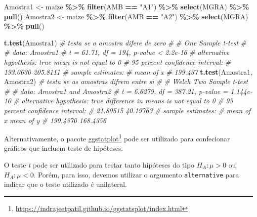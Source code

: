 \documentclass[
]{book}
\newenvironment{Shaded}{\begin{snugshade}}{\end{snugshade}}
\newcommand{\CommentTok}[1]{\textcolor[rgb]{0.56,0.35,0.01}{\textit{#1}}}
\newcommand{\KeywordTok}[1]{\textcolor[rgb]{0.13,0.29,0.53}{\textbf{#1}}}
\newcommand{\NormalTok}[1]{#1}
\newcommand{\OperatorTok}[1]{\textcolor[rgb]{0.81,0.36,0.00}{\textbf{#1}}}
\newcommand{\StringTok}[1]{\textcolor[rgb]{0.31,0.60,0.02}{#1}}
\numberwithin{equation}{section}
\begin{document}
\begin{Shaded}
\begin{Highlighting}[]
\NormalTok{Amostra1 \textless{}{-}}\StringTok{ }\NormalTok{maize }\OperatorTok{\%\textgreater{}\%}\StringTok{ }\KeywordTok{filter}\NormalTok{(AMB }\OperatorTok{==}\StringTok{ "A1"}\NormalTok{) }\OperatorTok{\%\textgreater{}\%}\StringTok{ }\KeywordTok{select}\NormalTok{(MGRA) }\OperatorTok{\%\textgreater{}\%}\StringTok{ }\KeywordTok{pull}\NormalTok{()}
\NormalTok{Amostra2 \textless{}{-}}\StringTok{ }\NormalTok{maize }\OperatorTok{\%\textgreater{}\%}\StringTok{ }\KeywordTok{filter}\NormalTok{(AMB }\OperatorTok{==}\StringTok{ "A2"}\NormalTok{) }\OperatorTok{\%\textgreater{}\%}\StringTok{ }\KeywordTok{select}\NormalTok{(MGRA) }\OperatorTok{\%\textgreater{}\%}\StringTok{ }\KeywordTok{pull}\NormalTok{()}

\KeywordTok{t.test}\NormalTok{(Amostra1) }\CommentTok{\# testa se a amostra difere de zero}
\CommentTok{\# }
\CommentTok{\#   One Sample t{-}test}
\CommentTok{\# }
\CommentTok{\# data:  Amostra1}
\CommentTok{\# t = 61.71, df = 194, p{-}value \textless{} 2.2e{-}16}
\CommentTok{\# alternative hypothesis: true mean is not equal to 0}
\CommentTok{\# 95 percent confidence interval:}
\CommentTok{\#  193.0630 205.8111}
\CommentTok{\# sample estimates:}
\CommentTok{\# mean of x }
\CommentTok{\#   199.437}
\KeywordTok{t.test}\NormalTok{(Amostra1, Amostra2) }\CommentTok{\# testa se as amostras difrem entre si}
\CommentTok{\# }
\CommentTok{\#   Welch Two Sample t{-}test}
\CommentTok{\# }
\CommentTok{\# data:  Amostra1 and Amostra2}
\CommentTok{\# t = 6.6279, df = 387.21, p{-}value = 1.144e{-}10}
\CommentTok{\# alternative hypothesis: true difference in means is not equal to 0}
\CommentTok{\# 95 percent confidence interval:}
\CommentTok{\#  21.80515 40.19763}
\CommentTok{\# sample estimates:}
\CommentTok{\# mean of x mean of y }
\CommentTok{\#  199.4370  168.4356}
\end{Highlighting}
\end{Shaded}

Alternativamente, o pacote \href{https://indrajeetpatil.github.io/ggstatsplot/index.html}{ggstatplot}\footnote{\url{https://indrajeetpatil.github.io/ggstatsplot/index.html}} pode ser utilizado para confecionar gráficos que incluem teste de hipóteses.

O teste \emph{t} pode ser utilizado para testar tanto hipóteses do tipo \({H_A}:\mu > 0\) ou \({H_A}:\mu < 0\). Porém, para isso, devemos utilizar o argumento \texttt{alternative} para indicar que o teste utilizado é unilateral.
\end{document}
